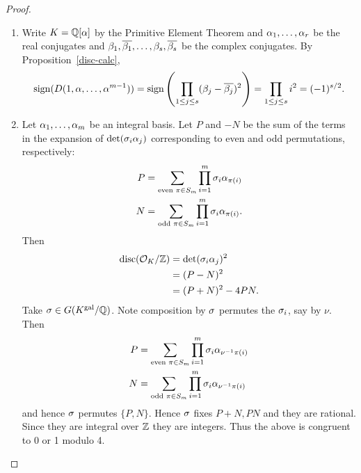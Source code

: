 \begin{proof}
\begin{enumerate}
\item
%
%
%
Write $K=\mathbb{Q}[\alpha]$ by the Primitive Element Theorem and $\alpha_1,\ldots, \alpha_r$ be the real conjugates and $\beta_1,\overline{\beta_1},\ldots, \beta_s,\overline{\beta_s}$ be the complex conjugates. By Proposition~\ref{disc-calc},
\[\operatorname{sign}(D(1,\alpha,\ldots, \alpha^{m-1}))=\operatorname{sign}\left( {\prod_{1\le j\le s} (\beta_j-\overline{\beta_j})^2} \right)=\prod_{1\le j\le s}i^2=(-1)^{s/2}.\]
\item Let $\alpha_1,\ldots, \alpha_m$ be an integral basis. Let $P$ and $-N$ be the sum of the terms in the expansion of $\det(\sigma_i\alpha_j)$ corresponding to even and odd permutations, respectively:
\begin{align*}
P&=\sum_{\text{even }\pi\in S_m}\prod_{i=1}^m\sigma_i\alpha_{\pi(i)}\\
N&=\sum_{\text{odd }\pi\in S_m}\prod_{i=1}^m\sigma_i\alpha_{\pi(i)}.
\end{align*}
Then
\begin{align*}
\operatorname{disc}(\mathcal{O}_K/\mathbb{Z})&=\det(\sigma_i\alpha_j)^2\\
&=(P-N)^2\\
&=(P+N)^2-4PN.
\end{align*}
Take $\sigma\in G(K^{\text{gal}}/\mathbb{Q})$. Note composition by $\sigma$ permutes the $\sigma_i$, say by $\nu$. Then 
\begin{align*}
P&=\sum_{\text{even }\pi\in S_m}\prod_{i=1}^m\sigma_i\alpha_{\nu^{-1}\pi(i)}\\
N&=\sum_{\text{odd }\pi\in S_m}\prod_{i=1}^m\sigma_i\alpha_{\nu^{-1}\pi(i)}\\
\end{align*}
and hence $\sigma$ permutes $\{P,N\}$.
Hence $\sigma$ fixes $P+N,PN$ and they are rational. Since they are integral over $\mathbb{Z}$ they are integers. Thus the above is congruent to 0 or 1 modulo 4.
\end{enumerate}
\end{proof}

